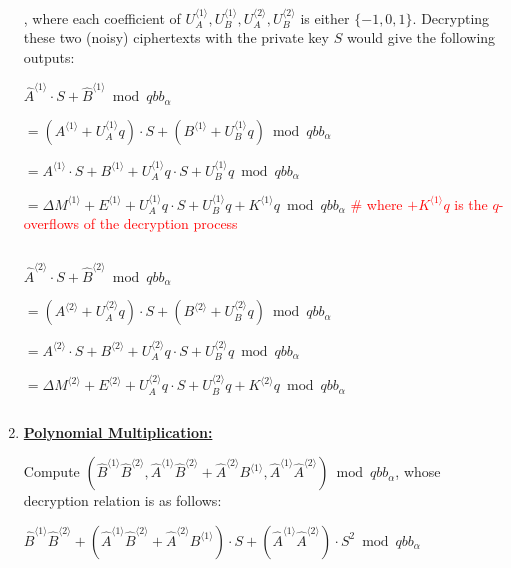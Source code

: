 \begin{enumerate}
, where each coefficient of $U_A^{\langle 1 \rangle}, U_B^{\langle 1 \rangle}, U_A^{\langle 2 \rangle}, U_B^{\langle 2 \rangle}$ is either $\{-1, 0, 1\}$. Decrypting these two (noisy) ciphertexts with the private key $S$ would give the following outputs:

$\hat{A}^{\langle 1 \rangle}\cdot S + \hat{B}^{\langle 1 \rangle} \bmod qbb_\alpha$

$ = (A^{\langle 1 \rangle} + U_A^{\langle 1 \rangle}q) \cdot S + (B^{\langle 1 \rangle} + U_B^{\langle 1 \rangle}q) \bmod qbb_\alpha$

$ = A^{\langle 1 \rangle}\cdot S + B^{\langle 1 \rangle} + U_A^{\langle 1 \rangle}q \cdot S + U_B^{\langle 1 \rangle}q \bmod qbb_\alpha$ 

$ = \Delta M^{\langle 1 \rangle} + E^{\langle 1 \rangle} + U_A^{\langle 1 \rangle}q \cdot S + U_B^{\langle 1 \rangle}q  + K^{\langle 1 \rangle} q  \bmod qbb_\alpha$ \textcolor{red}{ \# where $ + K^{\langle 1 \rangle} q$ is the $q$-overflows of the decryption process}

$ $

$ \hat{A}^{\langle 2 \rangle}\cdot S + \hat{B}^{\langle 2 \rangle}  \bmod qbb_\alpha$ 

$ = (A^{\langle 2 \rangle} + U_A^{\langle 2 \rangle}q) \cdot S + (B^{\langle 2 \rangle} + U_B^{\langle 2 \rangle}q) \bmod qbb_\alpha$

$ = A^{\langle 2 \rangle}\cdot S + B^{\langle 2 \rangle} + U_A^{\langle 2 \rangle}q \cdot S + U_B^{\langle 2 \rangle}q  \bmod qbb_\alpha$ 

$ = \Delta M^{\langle 2 \rangle} + E^{\langle 2 \rangle} + U_A^{\langle 2 \rangle}q \cdot S + U_B^{\langle 2 \rangle}q + K^{\langle 2 \rangle} q  \bmod qbb_\alpha$


$ $

\item \textbf{\underline{Polynomial Multiplication:}}

 Compute $(\hat{B}^{\langle 1 \rangle}\hat{B}^{\langle 2 \rangle}, \hat{A}^{\langle 1 \rangle}\hat{B}^{\langle 2 \rangle} + \hat{A}^{\langle 2 \rangle}B^{\langle 1 \rangle}, \hat{A}^{\langle 1 \rangle}\hat{A}^{\langle 2 \rangle}) \bmod qbb_\alpha$, whose decryption relation is as follows:

$\hat{B}^{\langle 1 \rangle}\hat{B}^{\langle 2 \rangle} + (\hat{A}^{\langle 1 \rangle}\hat{B}^{\langle 2 \rangle} + \hat{A}^{\langle 2 \rangle}B^{\langle 1 \rangle})\cdot S + (\hat{A}^{\langle 1 \rangle}\hat{A}^{\langle 2 \rangle})\cdot S^2  \bmod qbb_\alpha$


\end{enumerate}
